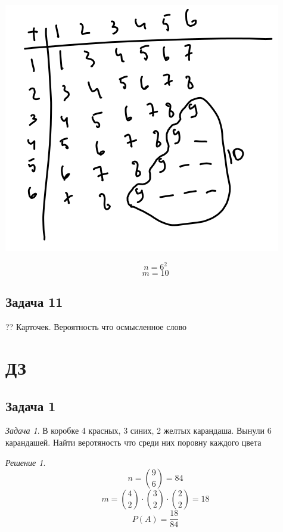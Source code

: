 \documentclass[english]{article}
\theoremstyle{plain}
\theoremstyle{remark}
\newtheorem*{task}{Задача}
\newtheorem*{solution}{Решение}
\theoremstyle{definition}
\begin{document}
\begin{center}
\includegraphics[scale=0.5]{1_11.png}
\end{center}

\[ n = 6^2 \]
\[ m = 10 \]

\subsection{Задача 11}
\label{sec:orga7db073}
?? Карточек. Вероятность что осмысленное слово

\section{ДЗ}
\label{sec:org925e9fc}
\subsection{Задача 1}
\label{sec:orgaaa152e}
\begin{task}
В коробке 4 красных, 3 синих, 2 желтых карандаша. Вынули 6 карандашей. Найти веротяность что среди них поровну каждого цвета
\end{task}
\begin{solution}
\[ n = \binom{9}{6} = 84 \]
\[ m = \binom{4}{2}\cdot\binom{3}{2}\cdot\binom{2}{2} = 18 \]
\[ P(A) = \frac{18}{84} \]
\end{solution}
\end{document}

